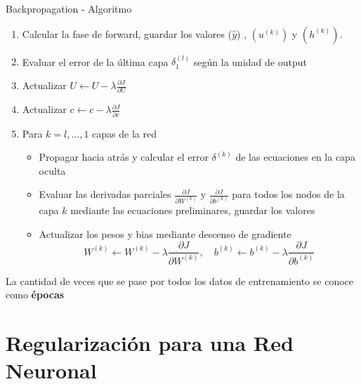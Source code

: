 \documentclass[handout, 9pt]{beamer}
\begin{document}
\begin{frame}{Backpropagation - Algoritmo}

\begin{enumerate}


  \item Calcular la fase de forward, guardar los valores ($\hat{y}$) , $(u^{(k)})$ y $(h^{(k)})$. \pause


  \item Evaluar el error de la última capa $\delta_1^{(l)}$ según la unidad de output \pause
  
  \item Actualizar $U \gets U - \lambda \frac{\partial J}{\partial U}$ \pause
  
  \item Actualizar $c \gets c - \lambda \frac{\partial J}{\partial c}$ \pause

  \item Para $k=l, \dots ,1$ capas de la red \pause

  \begin{itemize}
    \item Propagar hacia atrás y calcular el error $\delta^{(k)}$ de las ecuaciones en la capa oculta  \pause
    \item Evaluar las derivadas parciales $\frac{\partial J}{\partial W^{(k)}}$ y $\frac{\partial J}{\partial b^{(k)}}$ para todos los nodos de la capa $k$ mediante las ecuaciones preliminares, guardar los valores \pause


    \item Actualizar los pesos y bias mediante descenso de gradiente 
    \[
    W^{(k)} \gets W^{(k)} - \lambda \frac{\partial J}{\partial W^{(k)}}, \quad b^{(k)} \gets b^{(k)} - \lambda \frac{\partial J}{\partial b^{(k)}}
    \] \pause 

  \end{itemize}

\end{enumerate}

\begin{observacion}

 La cantidad de veces que se pase por todos los datos de entrenamiento se conoce como \textbf{épocas}

\end{observacion}

\end{frame}

\section{Regularización para una Red Neuronal}
\end{document}
